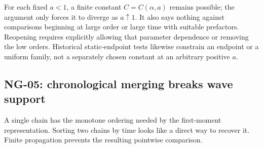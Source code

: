 For each fixed $a<1$, a finite constant $C=C(\alpha,a)$ remains possible;
the argument only forces it to diverge as $a\uparrow1$. It also says
nothing against comparisons beginning at large order or large time with
suitable prefactors. Reopening requires explicitly allowing that parameter
dependence or removing the low orders. Historical static-endpoint tests
likewise constrain an endpoint or a uniform family, not a separately
chosen constant at an arbitrary positive $a$.

\subsection{NG-05: chronological merging breaks wave support}
\label{S:nogo-05}

A single chain has the monotone ordering needed by the first-moment
representation. Sorting two chains by time looks like a direct way to
recover it. Finite propagation prevents the resulting pointwise comparison.

